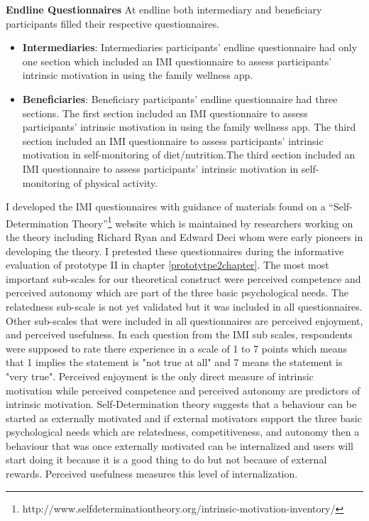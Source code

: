 \textbf{Endline Questionnaires}
At endline both intermediary and beneficiary participants filled their respective questionnaires. 
\begin{itemize}
\item{\textbf{Intermediaries}}: Intermediaries participants' endline questionnaire had only one section which included an IMI questionnaire  to assess participants' intrinsic motivation in using the family wellness app.
\item{\textbf{Beneficiaries}}: Beneficiary participants' endline questionnaire had three sections. The first section included an IMI questionnaire  to assess participants' intrinsic motivation in using the family wellness app. The third section included an IMI questionnaire to assess participants' intrinsic motivation in self-monitoring of diet/nutrition.The third section included an IMI questionnaire to assess participants' intrinsic motivation in self-monitoring of physical activity.
\end{itemize}
I developed the IMI questionnaires with guidance of materials found on a ``Self-Determination Theory''\footnote{http://www.selfdeterminationtheory.org/intrinsic-motivation-inventory/} website which is maintained by researchers working on the theory including Richard Ryan and Edward Deci\citep{deci1985intrinsic} whom were early pioneers in developing the theory. I pretested these questionnaires during the informative evaluation of prototype II in chapter \ref{prototytpe2chapter}.  The most most important sub-scales for our theoretical construct were perceived competence and perceived autonomy which are part of the three basic psychological needs. The relatedness sub-scale is not yet validated but it was included in all questionnaires. Other sub-scales that were included in all questionnaires are perceived enjoyment, and perceived usefulness. In each question from the IMI sub scales, respondents were supposed to rate there experience in a scale of 1 to 7 points which means that 1 implies the statement is "not true at all" and 7 means the statement is "very true". \newline
Perceived enjoyment is the only direct measure of intrinsic motivation while perceived competence and perceived autonomy are predictors of intrinsic motivation. Self-Determination theory suggests that a behaviour can be started as externally motivated and if external motivators support the three basic psychological needs which are relatedness, competitiveness, and autonomy then a behaviour that was once externally motivated can be internalized and users will start doing it because it is a good thing to do but not because of external rewards\citep{deci1985intrinsic}. Perceived usefulness measures this level of internalization.
